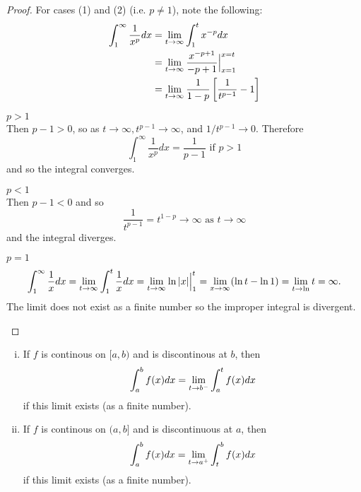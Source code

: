 \documentclass[a4paper,11pt]{article}
\begin{document}
\begin{outline}
    \begin{proof}
      For cases (1) and (2) (i.e. \(p \neq 1\)), note the following:
      \begin{align*}
        \int_1^{\infty}\frac{1}{x^p} dx &= \xlimit{t}{\infty}\int_1^tx^{-p} dx \\
                                        &= \xlimit{t}{\infty}\frac{x^{-p+1}}{-p+1}\Big\vert_{x=1}^{x=t} \\
                                        &= \xlimit{t}{\infty}\frac{1}{1-p}\left[\frac{1}{t^{p-1}}-1\right]
      \end{align*}
      \begin{proofcases}
        \item \(p > 1\)\\
          Then \(p-1 > 0\), so as \(t\rightarrow\infty, t^{p-1}\rightarrow\infty\), and \(1/t^{p-1}\rightarrow 0\).
          Therefore \[ \int_1^{\infty}\frac{1}{x^p}dx = \frac{1}{p-1}\text{ if }p > 1 \] and so the integral converges.
        \item \(p < 1\)\\
          Then \(p-1<0\) and so \[\frac{1}{t^{p-1}} = t^{1-p}\rightarrow\infty\text{ as }t\rightarrow\infty\] and
          the integral diverges.
        \item \(p = 1\)
          \[
            \int_1^{\infty}\frac{1}{x}dx = \xlimit{t}{\infty}\int_1^t\frac{1}{x}dx 
                                         = \xlimit{t}{\infty}\ln{\norm{x}}\Big\vert_1^t
                                         = \xlimit{x}{\infty}(\ln{t}-\ln{1}) 
                                         = \xlimit{t}\ln{t} = \infty\text{.}
          \]
          The limit does not exist as a finite number so the improper integral is divergent.
      \end{proofcases}
    \end{proof}
    
  \pagebreak
    \begin{enumerate}[i.]
      \item 
        If \(f\) is continous on \([a, b)\) and is discontinous at \(b\), then
        \[\int_a^{b}f(x)dx = \xlimit[-]{t}{b}\int_a^t f(x)dx\] if this limit exists (as a finite number).
      \item
        If \(f\) is continous on \((a, b]\) and is discontinuous at \(a\), then
        \[ \int_a^bf(x)dx = \xlimit[+]{t}{a}\int_t^bf(x)dx \] if this limit exists (as a finite number).
        

\end{enumerate}
\end{outline}
\end{document}

